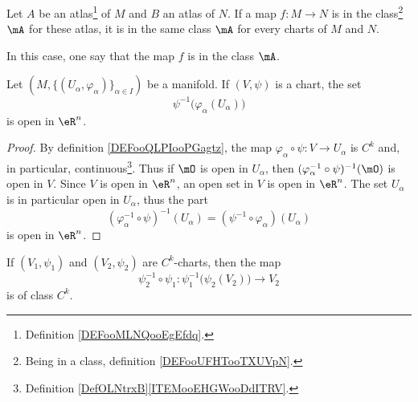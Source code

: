 \begin{propositionDef}          \label{PROPooUFGQooACIjVL}
    Let \( A\) be an atlas\footnote{Definition \ref{DEFooMLNQooEgEfdq}.} of \( M\) and \( B\) an atlas of \( N\). If a map \( f\colon M\to N\) is in the class\footnote{Being in a class, definition \ref{DEFooUFHTooTXUVpN}.} \( \mA\) for these atlas, it is in the same class \( \mA\) for every charts of \( M\) and \( N\).

    In this case, one say that the map \( f\) is in the class \( \mA\).
\end{propositionDef}

\begin{lemma}       \label{LEMooGAMVooIWUzmy}
    Let \( (M,\{ (U_{\alpha}, \varphi_{\alpha}) \}_{\alpha\in I}) \) be a manifold. If \( (V,\psi)\) is a chart, the set
    \begin{equation}
        \psi^{-1}\big(\varphi_{\alpha}(U_{\alpha})\big)
    \end{equation}
    is open in \(\eR^n\).
\end{lemma}

\begin{proof}
    By definition \ref{DEFooQLPIooPGagtz}, the map \( \varphi_{\alpha}\circ \psi \colon V\to U_{\alpha}\) is \( C^k\) and, in particular, continuous\footnote{Definition \ref{DefOLNtrxB}\ref{ITEMooEHGWooDdITRV}.}. Thus if \( \mO\) is open in \( U_{\alpha}\), then \( (\varphi_{\alpha}^{-1}\circ\psi)^{-1}(\mO)\) is open in \( V\). Since \( V\) is open in \( \eR^n\), an open set in \( V\) is open in \( \eR^n\). The set \( U_{\alpha}\) is in particular open in \( U_{\alpha}\), thus the part
    \begin{equation}
        (\varphi_{\alpha}^{-1}\circ \psi)^{-1}(U_{\alpha})=(\psi^{-1}\circ\varphi_{\alpha})(U_{\alpha})
    \end{equation}
    is open in \( \eR^n\).
\end{proof}

\begin{proposition}      \label{PROPooUDVFooEJeluM}
    If \( (V_1,\psi_1)\) and \( (V_2,\psi_2)\) are \( C^k\)-charts, then the map
    \begin{equation}
        \psi_2^{-1}\circ \psi_1\colon \psi_1^{-1}\big( \psi_2(V_2) \big)\to V_2
    \end{equation}
    is of class \( C^k\).
\end{proposition}

